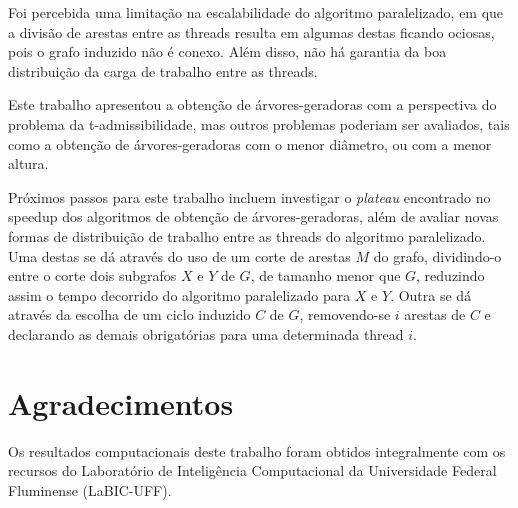 \documentclass[article,a4paper,12pt,brazil,sumario=tradicional]{abntex2}
\theoremstyle{definition} %
\begin{document}
Foi percebida uma limitação na escalabilidade do algoritmo paralelizado, em que a divisão de arestas entre as threads resulta em algumas destas ficando ociosas, pois o grafo induzido não é conexo. Além disso, não há garantia da boa distribuição da carga de trabalho entre as threads.

Este trabalho apresentou a obtenção de árvores-geradoras com a perspectiva do problema da t-admissibilidade, mas outros problemas poderiam ser avaliados, tais como a obtenção de árvores-geradoras com o menor diâmetro, ou com a menor altura.

Próximos passos para este trabalho incluem investigar o \textit{plateau} encontrado no speedup dos algoritmos de obtenção de árvores-geradoras, além de avaliar novas formas de distribuição de trabalho entre as threads do algoritmo paralelizado. Uma destas se dá através do uso de um corte de arestas $M$ do grafo, dividindo-o entre o corte dois subgrafos $X$ e $Y$ de $G$, de tamanho menor que $G$, reduzindo assim o tempo decorrido do algoritmo paralelizado para $X$ e $Y$. Outra se dá através da escolha de um ciclo induzido $C$ de $G$, removendo-se $i$ arestas de $C$ e declarando as demais obrigatórias para uma determinada thread $i$\cite{cunha_marciano_moraes_santiago_santos}.

\clearpage


\newpage
\renewcommand{\listfigurename}{APÊNDICE A - Lista de ilustrações}
\listoffigures


\newpage
\chapter*{Agradecimentos}
\noindent

Os resultados computacionais deste trabalho foram obtidos integralmente com os recursos do Laboratório de Inteligência Computacional da Universidade Federal Fluminense (LaBIC-UFF).
\end{document}
